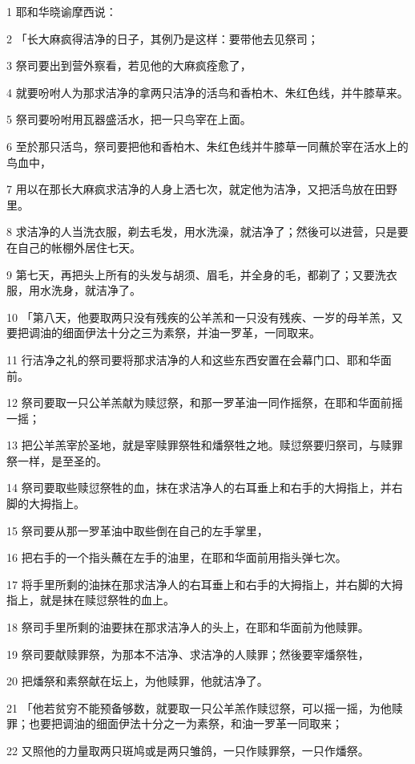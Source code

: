 \par 1 耶和华晓谕摩西说：
\par 2 「长大麻疯得洁净的日子，其例乃是这样：要带他去见祭司；
\par 3 祭司要出到营外察看，若见他的大麻疯痊愈了，
\par 4 就要吩咐人为那求洁净的拿两只洁净的活鸟和香柏木、朱红色线，并牛膝草来。
\par 5 祭司要吩咐用瓦器盛活水，把一只鸟宰在上面。
\par 6 至於那只活鸟，祭司要把他和香柏木、朱红色线并牛膝草一同蘸於宰在活水上的鸟血中，
\par 7 用以在那长大麻疯求洁净的人身上洒七次，就定他为洁净，又把活鸟放在田野里。
\par 8 求洁净的人当洗衣服，剃去毛发，用水洗澡，就洁净了；然後可以进营，只是要在自己的帐棚外居住七天。
\par 9 第七天，再把头上所有的头发与胡须、眉毛，并全身的毛，都剃了；又要洗衣服，用水洗身，就洁净了。
\par 10 「第八天，他要取两只没有残疾的公羊羔和一只没有残疾、一岁的母羊羔，又要把调油的细面伊法十分之三为素祭，并油一罗革，一同取来。
\par 11 行洁净之礼的祭司要将那求洁净的人和这些东西安置在会幕门口、耶和华面前。
\par 12 祭司要取一只公羊羔献为赎愆祭，和那一罗革油一同作摇祭，在耶和华面前摇一摇；
\par 13 把公羊羔宰於圣地，就是宰赎罪祭牲和燔祭牲之地。赎愆祭要归祭司，与赎罪祭一样，是至圣的。
\par 14 祭司要取些赎愆祭牲的血，抹在求洁净人的右耳垂上和右手的大拇指上，并右脚的大拇指上。
\par 15 祭司要从那一罗革油中取些倒在自己的左手掌里，
\par 16 把右手的一个指头蘸在左手的油里，在耶和华面前用指头弹七次。
\par 17 将手里所剩的油抹在那求洁净人的右耳垂上和右手的大拇指上，并右脚的大拇指上，就是抹在赎愆祭牲的血上。
\par 18 祭司手里所剩的油要抹在那求洁净人的头上，在耶和华面前为他赎罪。
\par 19 祭司要献赎罪祭，为那本不洁净、求洁净的人赎罪；然後要宰燔祭牲，
\par 20 把燔祭和素祭献在坛上，为他赎罪，他就洁净了。
\par 21 「他若贫穷不能预备够数，就要取一只公羊羔作赎愆祭，可以摇一摇，为他赎罪；也要把调油的细面伊法十分之一为素祭，和油一罗革一同取来；
\par 22 又照他的力量取两只斑鸠或是两只雏鸽，一只作赎罪祭，一只作燔祭。

